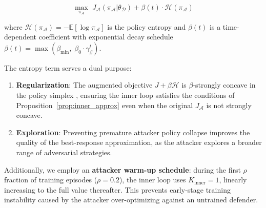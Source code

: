 \begin{equation}
    \max_{\pi_{\mathcal{A}}} \; J_{\mathcal{A}}(\pi_{\mathcal{A}} | \theta_{\mathcal{D}}) + \beta(t) \cdot \mathcal{H}(\pi_{\mathcal{A}})
    \label{eq:entropy_reg}
\end{equation}

where $\mathcal{H}(\pi_{\mathcal{A}}) = -\mathbb{E}[\log \pi_{\mathcal{A}}]$ is the policy entropy and $\beta(t)$ is a time-dependent coefficient with exponential decay schedule $\beta(t) = \max(\beta_{\min},\; \beta_0 \cdot \gamma_\beta^t)$.

The entropy term serves a dual purpose:
\begin{enumerate}
    \item \textbf{Regularization}: The augmented objective $J + \beta \mathcal{H}$ is $\beta$-strongly concave in the policy simplex \cite{geist2019entropy}, ensuring the inner loop satisfies the conditions of Proposition~\ref{prop:inner_approx} even when the original $J_{\mathcal{A}}$ is not strongly concave.
    \item \textbf{Exploration}: Preventing premature attacker policy collapse improves the quality of the best-response approximation, as the attacker explores a broader range of adversarial strategies.
\end{enumerate}

Additionally, we employ an \textbf{attacker warm-up schedule}: during the first $\rho$ fraction of training episodes ($\rho = 0.2$), the inner loop uses $K_{\text{inner}} = 1$, linearly increasing to the full value thereafter. This prevents early-stage training instability caused by the attacker over-optimizing against an untrained defender.

